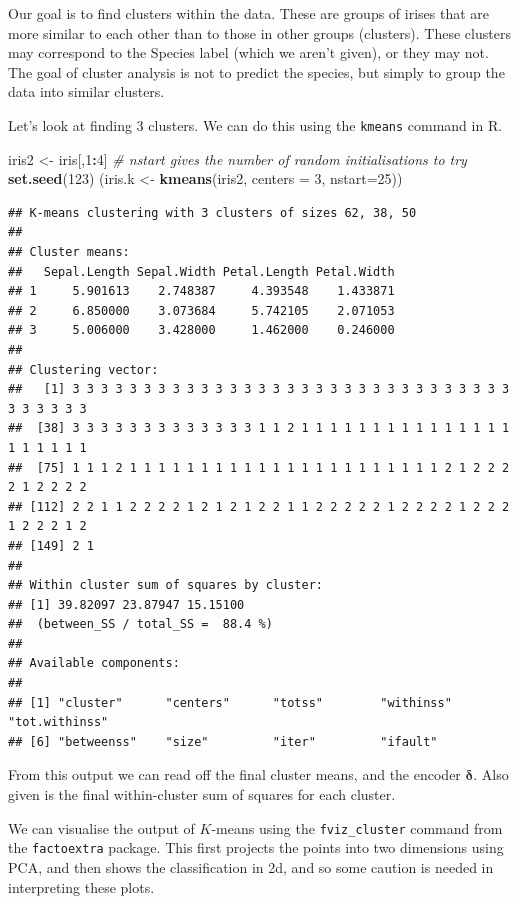 \documentclass[
]{book}
\newenvironment{Shaded}{\begin{snugshade}}{\end{snugshade}}
\newcommand{\AttributeTok}[1]{\textcolor[rgb]{0.13,0.29,0.53}{#1}}
\newcommand{\CommentTok}[1]{\textcolor[rgb]{0.56,0.35,0.01}{\textit{#1}}}
\newcommand{\DecValTok}[1]{\textcolor[rgb]{0.00,0.00,0.81}{#1}}
\newcommand{\FunctionTok}[1]{\textcolor[rgb]{0.13,0.29,0.53}{\textbf{#1}}}
\newcommand{\NormalTok}[1]{#1}
\newcommand{\OtherTok}[1]{\textcolor[rgb]{0.56,0.35,0.01}{#1}}
\newcommand{\SpecialCharTok}[1]{\textcolor[rgb]{0.81,0.36,0.00}{\textbf{#1}}}
\theoremstyle{definition}
\theoremstyle{definition}
\theoremstyle{definition}
\theoremstyle{definition}
\theoremstyle{remark}
\begin{document}
Our goal is to find clusters within the data. These are groups of irises that are more similar to each other than to those in other groups (clusters). These clusters may correspond to the Species label (which we aren't given), or they may not. The goal of cluster analysis is not to predict the species, but simply to group the data into similar clusters.

Let's look at finding 3 clusters. We can do this using the \texttt{kmeans} command in R.

\begin{Shaded}
\begin{Highlighting}[]
\NormalTok{iris2 }\OtherTok{\textless{}{-}}\NormalTok{ iris[,}\DecValTok{1}\SpecialCharTok{:}\DecValTok{4}\NormalTok{]}
\CommentTok{\# nstart gives the number of random initialisations to try }
\FunctionTok{set.seed}\NormalTok{(}\DecValTok{123}\NormalTok{)}
\NormalTok{(iris.k }\OtherTok{\textless{}{-}} \FunctionTok{kmeans}\NormalTok{(iris2, }\AttributeTok{centers =} \DecValTok{3}\NormalTok{, }\AttributeTok{nstart=}\DecValTok{25}\NormalTok{)) }
\end{Highlighting}
\end{Shaded}

\begin{verbatim}
## K-means clustering with 3 clusters of sizes 62, 38, 50
## 
## Cluster means:
##   Sepal.Length Sepal.Width Petal.Length Petal.Width
## 1     5.901613    2.748387     4.393548    1.433871
## 2     6.850000    3.073684     5.742105    2.071053
## 3     5.006000    3.428000     1.462000    0.246000
## 
## Clustering vector:
##   [1] 3 3 3 3 3 3 3 3 3 3 3 3 3 3 3 3 3 3 3 3 3 3 3 3 3 3 3 3 3 3 3 3 3 3 3 3 3
##  [38] 3 3 3 3 3 3 3 3 3 3 3 3 3 1 1 2 1 1 1 1 1 1 1 1 1 1 1 1 1 1 1 1 1 1 1 1 1
##  [75] 1 1 1 2 1 1 1 1 1 1 1 1 1 1 1 1 1 1 1 1 1 1 1 1 1 1 2 1 2 2 2 2 1 2 2 2 2
## [112] 2 2 1 1 2 2 2 2 1 2 1 2 1 2 2 1 1 2 2 2 2 2 1 2 2 2 2 1 2 2 2 1 2 2 2 1 2
## [149] 2 1
## 
## Within cluster sum of squares by cluster:
## [1] 39.82097 23.87947 15.15100
##  (between_SS / total_SS =  88.4 %)
## 
## Available components:
## 
## [1] "cluster"      "centers"      "totss"        "withinss"     "tot.withinss"
## [6] "betweenss"    "size"         "iter"         "ifault"
\end{verbatim}

From this output we can read off the final cluster means, and the encoder \(\boldsymbol \delta\). Also given is the final within-cluster sum of squares for each cluster.

We can visualise the output of \(K\)-means using the \texttt{fviz\_cluster} command from the \texttt{factoextra} package. This first projects the points into two dimensions using PCA, and then shows the classification in 2d, and so some caution is needed in interpreting these plots.
\end{document}
